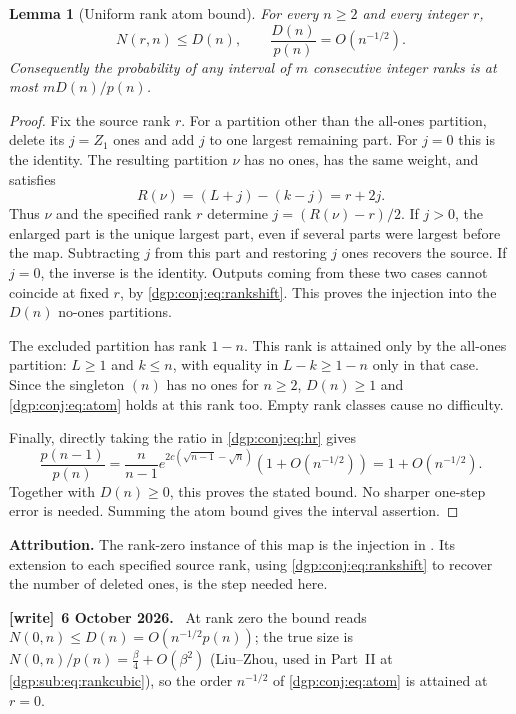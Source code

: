 \documentclass[11pt,letterpaper]{article}
\numberwithin{equation}{section}
\newtheorem{lemma}[theorem]{Lemma}
\theoremstyle{remark}\newtheorem{remark}[theorem]{Remark}
\newenvironment{writenote}[1][]{\par\smallskip\begingroup\small
 \noindent\textbf{[write]}\if\relax\detokenize{#1}\relax\else~\textbf{#1.}\fi\ }%
 {\par\endgroup\smallskip}
\begin{document}
\begin{lemma}[Uniform rank atom bound]\label{dgp:conj:lem:atom}
For every $n\geq2$ and every integer $r$,
\begin{equation}\label{dgp:conj:eq:atom}
 N(r,n)\leq D(n),\qquad \frac{D(n)}{p(n)}=O(n^{-1/2}).
\end{equation}
Consequently the probability of any interval of $m$ consecutive
integer ranks is at most $mD(n)/p(n)$.
\end{lemma}
\begin{proof}
Fix the source rank $r$. For a partition other than the all-ones
partition, delete its $j=Z_1$ ones and add $j$ to one largest remaining
part. For $j=0$ this is the identity. The resulting partition $\nu$
has no ones, has the same weight, and satisfies
\begin{equation}\label{dgp:conj:eq:rankshift}
 R(\nu)=(L+j)-(k-j)=r+2j.
\end{equation}
Thus $\nu$ and the specified rank $r$ determine
$j=(R(\nu)-r)/2$. If $j>0$, the enlarged part is the unique largest
part, even if several parts were largest before the map. Subtracting
$j$ from this part and restoring $j$ ones recovers the source. If
$j=0$, the inverse is the identity. Outputs coming from these two
cases cannot coincide at fixed $r$, by \eqref{dgp:conj:eq:rankshift}.
This proves the injection into the $D(n)$ no-ones partitions.

The excluded partition has rank $1-n$. This rank is attained only
by the all-ones partition: $L\geq1$ and $k\leq n$, with equality in
$L-k\geq1-n$ only in that case. Since the singleton $(n)$ has no ones
for $n\geq2$, $D(n)\geq1$ and \eqref{dgp:conj:eq:atom} holds at this rank too.
Empty rank classes cause no difficulty.

Finally, directly taking the ratio in \eqref{dgp:conj:eq:hr} gives
\[
 \frac{p(n-1)}{p(n)}
 =\frac{n}{n-1}e^{2c(\sqrt{n-1}-\sqrt n)}
    \left(1+O(n^{-1/2})\right)
 =1+O(n^{-1/2}).
\]
Together with $D(n)\geq0$, this proves the stated bound. No sharper
one-step error is needed. Summing the atom bound gives the interval
assertion.
\end{proof}

\noindent\textbf{Attribution.}
The rank-zero instance of this map is the injection in
\cite[Lemma~5.4]{abek}. Its extension to each specified source rank,
using \eqref{dgp:conj:eq:rankshift} to recover the number of deleted ones,
is the step needed here.
\begin{writenote}[6 October 2026]
At rank zero the bound reads $N(0,n)\le D(n)=O(n^{-1/2}p(n))$; the true size is $N(0,n)/p(n)=\frac\beta4+O(\beta^2)$ (Liu--Zhou, used in Part~II at \eqref{dgp:sub:eq:rankcubic}), so the order $n^{-1/2}$ of \eqref{dgp:conj:eq:atom} is attained at $r=0$.
\end{writenote}
\end{document}
